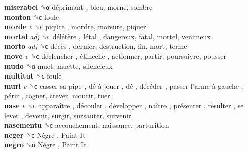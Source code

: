 \textbf{miserabel} ␝α   déprimant , bleu, morne, sombre  \\
\textbf{monton} ␝ϲ  foule  \\
\textbf{morde} \emph{v}  ␝ϲ   piqûre , mordre, morsure, piquer  \\
\textbf{mortal} \emph{adj}  ␝ϲ   délétère ,  létal , dangereux, fatal, mortel, venimeux  \\
\textbf{morto} \emph{adj}  ␝ϲ   décès , dernier, destruction, fin, mort, terme  \\
\textbf{move} \emph{v}  ␝ϲ   déclencher ,  étincelle , actionner, partir, poursuivre, pousser  \\
\textbf{mudo} ␝α  muet, muette, silencieux  \\
\textbf{multitut} ␝ϲ  foule  \\
\textbf{muri} \emph{v}  ␝ϲ   casser sa pipe ,  dé à jouer ,  dé ,  décéder ,  passer l’arme à gauche ,  périr , cogner, crever, mourir, tuer  \\
\textbf{nase} \emph{v}  ␝ϲ   apparaître ,  découler ,  développer ,  naître ,  présenter ,  résulter ,  se lever , devenir, surgir, sursauter, survenir  \\
\textbf{nasementu} ␝ϲ  accouchement, naissance, parturition  \\
\textbf{neger} ␝ϲ   Nègre ,  Paint It   \\
\textbf{negro} ␝α   Nègre ,  Paint It   \\
